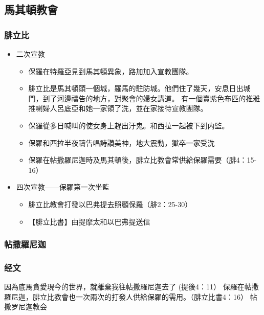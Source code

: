 \subsection{馬其頓教會}
\subsubsection{腓立比}
\begin{itemize}%
\itemsep-.25em 
\item  二次宣教
\begin{itemize}%
\itemsep-.15em 
\item 保羅在特羅亞見到馬其頓異象，路加加入宣教團隊。
\item 腓立比是馬其頓頭一個城，羅馬的駐防城。他們住了幾天，安息日出城門，到了河邊禱告的地方，對聚會的婦女講道。 有一個賣紫色布匹的推雅推喇婦人呂底亞和她一家領了洗，並在家接待宣教團隊。
\item 保羅從多日喊叫的使女身上趕出汙鬼。和西拉一起被下到内監。
\item 保羅和西拉半夜禱告唱詩讚美神，地大震動，獄卒一家受洗
\item 保羅在帖撒羅尼迦時及馬其頓後，腓立比教會常供給保羅需要（腓4：15-16）
\end{itemize}
\item  四次宣教——保羅第一次坐監
\begin{itemize}%
\itemsep-.25em 
\item 腓立比教會打發以巴弗提去照顧保羅（腓2：25-30）
\item 【腓立比書】由提摩太和以巴弗提送信
\end{itemize}
\end{itemize}




\subsubsection{帖撒羅尼迦}

\subsubsection{经文}
因為底馬貪愛現今的世界，就離棄我往帖撒羅尼迦去了 (提後4：11）
保羅在帖撒羅尼迦，腓立比教會也一次兩次的打發人供給保羅的需用。（腓立比書4：16）
帖撒罗尼迦教会
                                                          

